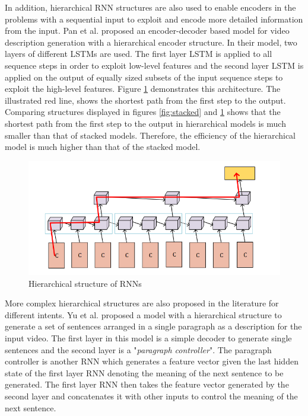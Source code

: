 \documentclass[preprint, 12pt]{elsarticle}
\begin{document}
		In addition, hierarchical RNN structures are also used to enable encoders in the problems with a sequential input to exploit and encode more detailed information from the input. Pan et al. \cite{pan2016hierarchical} proposed an encoder-decoder based model for video description generation with a hierarchical encoder structure. In their model, two layers of different LSTMs are used. The first layer LSTM is applied to all sequence steps in order to exploit low-level features and the second layer LSTM is applied on the output of equally sized subsets of the input sequence steps to exploit the high-level features. Figure \ref{fig:hrne} demonstrates this architecture. The illustrated red line, shows the shortest path from the first step to the output. Comparing structures displayed in figures \ref{fig:stacked} and \ref{fig:hrne} shows that the shortest path from the first step to the output in hierarchical models is much smaller than that of stacked models. Therefore, the efficiency of the hierarchical model is much higher than that of the stacked model.
				\begin{figure}[h]
			\centering
			\includegraphics[scale=0.4]{Imgs/hrne.png}
			\caption{Hierarchical structure of RNNs \cite{pan2016hierarchical}}
			\label{fig:hrne}
		\end{figure}
		More complex hierarchical structures are also proposed in the literature for different intents. Yu et al.\cite{yu2016video} proposed a model with a hierarchical structure to generate a set of sentences arranged in a single paragraph as a description for the input video. The first layer in this model is a simple decoder to generate single sentences and the second layer is a "\textit{paragraph controller}". The paragraph controller is another RNN which generates a feature vector given the last hidden state of the first layer RNN denoting the meaning of the next sentence to be generated. The first layer RNN then takes the feature vector generated by the second layer and concatenates it with other inputs to control the meaning of the next sentence.
				
\end{document}
